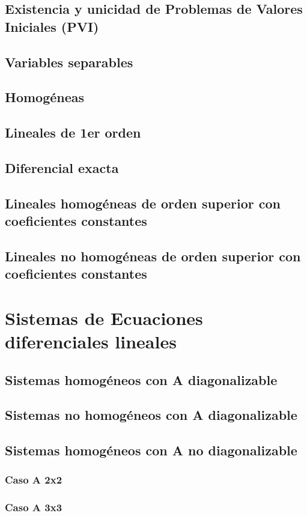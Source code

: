 \documentclass[oneside]{article}
\numberwithin{equation}{section}
\numberwithin{figure}{section}
\numberwithin{table}{section}
\begin{document}
				\subsection{Existencia y unicidad de Problemas de Valores Iniciales (PVI)}
				\subsection{Variables separables}
				\subsection{Homogéneas}
				\subsection{Lineales de 1er orden}
				\subsection{Diferencial exacta}
				\subsection{Lineales homogéneas de orden superior con coeficientes constantes}
				\subsection{Lineales no homogéneas de orden superior con coeficientes constantes}
			\section{Sistemas de Ecuaciones diferenciales lineales}
				\subsection{Sistemas homogéneos con A diagonalizable}
				\subsection{Sistemas no homogéneos con A diagonalizable}
				\subsection{Sistemas homogéneos con A no diagonalizable}
					\subsubsection{Caso A 2x2}
					\subsubsection{Caso A 3x3}
				
\pagebreak
\end{document}
